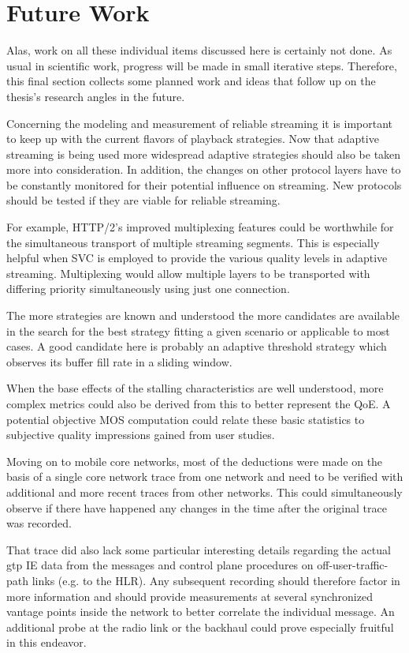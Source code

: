 \section{Future Work}

Alas, work on all these individual items discussed here is certainly not done. As usual in scientific work, progress will be made in small iterative steps. Therefore, this final section collects some planned work and ideas that follow up on the thesis's research angles in the future.

Concerning the modeling and measurement of reliable streaming it is important to keep up with the current flavors of playback strategies. Now that adaptive streaming is being used more widespread adaptive strategies should also be taken more into consideration. In addition, the changes on other protocol layers have to be constantly monitored for their potential influence on streaming. New protocols should be tested if they are viable for reliable streaming. 

For example, \gls{HTTP}/2's improved multiplexing features could be worthwhile for the simultaneous transport of multiple streaming segments. This is especially helpful when \gls{SVC} is employed to provide the various quality levels in adaptive streaming. Multiplexing would allow multiple layers to be transported with differing priority simultaneously using just one connection.

The more strategies are known and understood the more candidates are available in the search for the best strategy fitting a given scenario or applicable to most cases. A good candidate here is probably an adaptive threshold strategy which observes its buffer fill rate in a sliding window.

When the base effects of the stalling characteristics are well understood, more complex metrics could also be derived from this to better represent the \gls{QoE}. A potential objective \gls{MOS} computation could relate these basic statistics to subjective quality impressions gained from user studies.

Moving on to mobile core networks, most of the deductions were made on the basis of a single core network trace from one network and need to be verified with additional and more recent traces from other networks. This could simultaneously observe if there have happened any changes in the time after the original trace was recorded.

That trace did also lack some particular interesting details regarding the actual \gls{gtp} \gls{IE} data from the messages and control plane procedures on off-user-traffic-path links (e.g. to the \gls{HLR}). Any subsequent recording should therefore factor in more information and should provide measurements at several synchronized vantage points inside the network to better correlate the individual message. An additional probe at the radio link or the backhaul could prove especially fruitful in this endeavor. 



